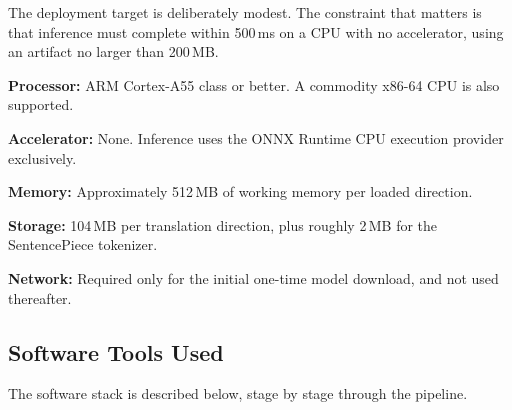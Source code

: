 The deployment target is deliberately modest. The constraint that matters is
that inference must complete within 500\,ms on a CPU with no accelerator, using
an artifact no larger than 200\,MB.

\begin{bullets}
\item \textbf{Processor:} ARM Cortex-A55 class or better. A commodity x86-64 CPU is also supported.
\item \textbf{Accelerator:} None. Inference uses the ONNX Runtime CPU execution provider exclusively.
\item \textbf{Memory:} Approximately 512\,MB of working memory per loaded direction.
\item \textbf{Storage:} 104\,MB per translation direction, plus roughly 2\,MB for the SentencePiece tokenizer.
\item \textbf{Network:} Required only for the initial one-time model download, and not used thereafter.
\end{bullets}

\subsection{Software Tools Used}
\label{subsec:sw}

The software stack is described below, stage by stage through the pipeline.


